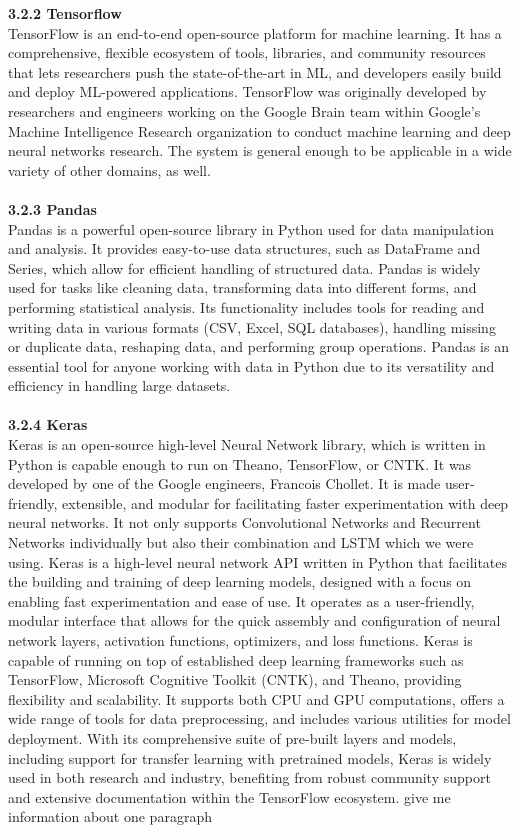 \documentclass[12pt, English]{article}
\begin{document}
\textbf{3.2.2 Tensorflow}\\
TensorFlow is an end-to-end open-source platform for machine learning. It has a comprehensive,
flexible ecosystem of tools, libraries, and community resources that lets researchers push the
state-of-the-art in ML, and developers easily build and deploy ML-powered applications.
TensorFlow was originally developed by researchers and engineers working on the Google
Brain team within Google’s Machine Intelligence Research organization to conduct machine learning
and deep neural networks research. The system is general enough to be applicable in a wide
variety of other domains, as well.
\\
\\
\textbf{3.2.3 Pandas}\\
Pandas is a powerful open-source library in Python used for data manipulation and analysis. It provides easy-to-use data structures, such as DataFrame and Series, which allow for efficient handling of structured data. Pandas is widely used for tasks like cleaning data, transforming data into different forms, and performing statistical analysis. Its functionality includes tools for reading and writing data in various formats (CSV, Excel, SQL databases), handling missing or duplicate data, reshaping data, and performing group operations. Pandas is an essential tool for anyone working with data in Python due to its versatility and efficiency in handling large datasets.
\\
\\
\textbf{3.2.4 Keras }\\
Keras is an open-source high-level Neural Network library, which is written in Python is capable
enough to run on Theano, TensorFlow, or CNTK. It was developed by one of the Google engineers,
Francois Chollet. It is made user-friendly, extensible, and modular for facilitating faster
experimentation with deep neural networks. It not only supports Convolutional Networks and
Recurrent Networks
individually but also their combination and LSTM which we were using.
Keras is a high-level neural network API written in Python that facilitates the building and training of deep learning models, designed with a focus on enabling fast experimentation and ease of use. It operates as a user-friendly, modular interface that allows for the quick assembly and configuration of neural network layers, activation functions, optimizers, and loss functions. Keras is capable of running on top of established deep learning frameworks such as TensorFlow, Microsoft Cognitive Toolkit (CNTK), and Theano, providing flexibility and scalability. It supports both CPU and GPU computations, offers a wide range of tools for data preprocessing, and includes various utilities for model deployment. With its comprehensive suite of pre-built layers and models, including support for transfer learning with pretrained models, Keras is widely used in both research and industry, benefiting from robust community support and extensive documentation within the TensorFlow ecosystem.
give me information about one paragraph\\
\end{document}
